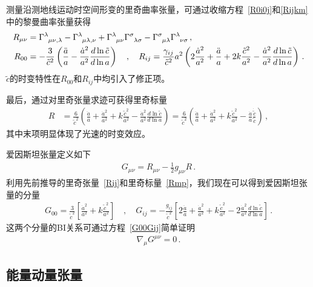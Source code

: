 \documentclass[jkps,preprint,fleqn]{revtex4}
\newcommand{\tc}{\tilde{c}}
\begin{document}
测量沿测地线运动时空间形变的里奇曲率张量，可通过收缩方程~\eqref{R0i0j}和\eqref{Rijkm}中的黎曼曲率张量获得
\begin{align}
R_{\mu\nu} &= \tensor{\Gamma}{^\lambda_\mu_\nu_,_\lambda} - \tensor{\Gamma}{^\lambda_\mu_\lambda_,_\nu} + \tensor{\Gamma}{^\lambda_\mu_\nu} \tensor{\Gamma}{^\sigma_\lambda_\sigma} - \tensor{\Gamma}{^\sigma_\mu_\lambda} \tensor{\Gamma}{^\lambda_\nu_\sigma} \label{Rmn} \,, \\ R_{00} &= -\frac{3}{\tc^2} \left( \frac{\ddot{a}}{a} - \frac{\dot{a}^2}{a^2} \frac{d \ln \tc}{ d \ln a}  \right) \quad , \quad R_{ij} = \frac{\gamma_{ij}}{\tc^2} a^2 \left( 2 \frac{\dot{a}^2}{a^2} + \frac{\ddot{a}}{a} + 2 k \frac{\tc^2}{a^2} - \frac{\dot{a}^2}{a^2} \frac{d \ln \tc}{ d \ln a}  \right) \label{Rij} \,. \end{align}
$\tc$的时变特性在$R_{00}$和$R_{ij}$中均引入了修正项。

最后，通过对里奇张量求迹可获得里奇标量
\begin{align} R &= \frac{6}{\tc^2} \left( \frac{\ddot{a}}{a} + \frac{\dot{a}^2}{a^2} + k \frac{\tc^2}{a^2} - \frac{\dot{a}^2}{a^2} \frac{d \ln \tc}{ d \ln a}  \right) =  \frac{6}{\tc^2} \left( \frac{\ddot{a}}{a} + \frac{\dot{a}^2}{a^2} + k \frac{\tc^2}{a^2} - \frac{\dot{a}}{a} \frac{\dot{\tc}}{\tc}  \right)  \label{Rmp} \,, \end{align}
其中末项明显体现了光速的时变效应。

爱因斯坦张量定义如下
\begin{align}
G_{\mu\nu} = R_{\mu\nu} - \frac{1}{2} g_{\mu\nu} R \label{Gmunu} \,.
\end{align}
利用先前推导的里奇张量~\eqref{Rij}和里奇标量~\eqref{Rmp}，我们现在可以得到爱因斯坦张量的分量
\begin{align}
G_{00} = \frac{3}{\tc^2} \left[ \frac{\dot{a}^2}{a^2} + k \frac{\tc^2}{a^2} \right] \quad , \quad G_{ij} = -\frac{g_{ij}}{\tc^2} \left[ 2 \frac{\ddot{a}}{a} + \frac{\dot{a}^2}{a^2} + k \frac{\tc^2}{a^2} - 2 \frac{\dot{a}^2}{a^2} \frac{d \ln \tc}{d \ln a} \right] \,. \label{G00Gij}
\end{align}
这两个分量的BI关系可通过方程~\eqref{G00Gij}简单证明
\begin{align}
\nabla_{\mu} G^{\mu \nu} = 0 \label{nablaGmunu} \,.
\end{align}
\subsection{能量动量张量}\label{subsec:Tmunu}
\end{document}
